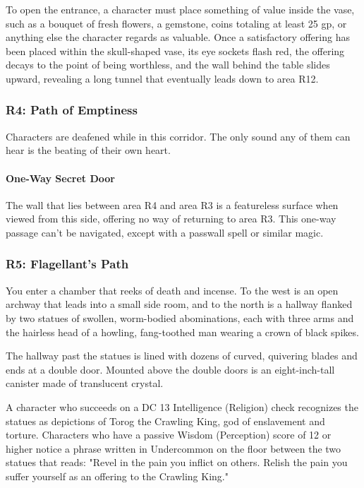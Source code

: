 \documentclass[10pt,a4paper,twoside,twocolumn,openany,nodeprecatedcode]{dndbook}
\begin{document}
To open the entrance, a character must place something of value inside the vase, such as a bouquet of fresh flowers, a gemstone, coins totaling at least 25 gp, or anything else the character regards as valuable. Once a satisfactory offering has been placed within the skull-shaped vase, its eye sockets flash red, the offering decays to the point of being worthless, and the wall behind the table slides upward, revealing a long tunnel that eventually leads down to area R12.

\subsubsection{R4: Path of Emptiness}
Characters are deafened while in this corridor. The only sound any of them can hear is the beating of their own heart.

\paragraph{One-Way Secret Door}
The wall that lies between area R4 and area R3 is a featureless surface when viewed from this side, offering no way of returning to area R3. This one-way passage can't be navigated, except with a passwall spell or similar magic.

\subsubsection{R5: Flagellant's Path}
\begin{DndReadAloud}{}
You enter a chamber that reeks of death and incense. To the west is an open archway that leads into a small side room, and to the north is a hallway flanked by two statues of swollen, worm-bodied abominations, each with three arms and the hairless head of a howling, fang-toothed man wearing a crown of black spikes.

The hallway past the statues is lined with dozens of curved, quivering blades and ends at a double door. Mounted above the double doors is an eight-inch-tall canister made of translucent crystal.

\end{DndReadAloud}

A character who succeeds on a DC 13 Intelligence (Religion) check recognizes the statues as depictions of Torog the Crawling King, god of enslavement and torture. Characters who have a passive Wisdom (Perception) score of 12 or higher notice a phrase written in Undercommon on the floor between the two statues that reads: "Revel in the pain you inflict on others. Relish the pain you suffer yourself as an offering to the Crawling King."
\end{document}
